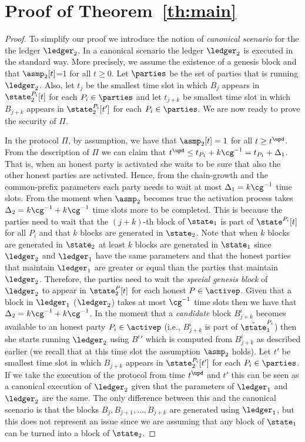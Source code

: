 \section{Proof of Theorem~\ref{th:main}}\label{se:proof}
\begin{proof}
To simplify our proof we introduce the notion of \emph{canonical scenario} for the the ledger $\ledger_2$. In a canonical scenario the ledger
$\ledger_2$ is executed in the standard way. More precisely, 
we assume the existence of a genesis block and that $\asmp_2[t]$=1 for all $t\geq 0$. Let $\parties$ be the set of parties that is running $\ledger_2$. Also, 
let $t_j$ be the smallest time slot in which $B_j$ appears in $\state_2^{P_i}[t]$ for each $P_i\in\parties$ and let $t_{j+k}$ be smallest time slot in which $B_{j+k}$ appears in 
$\state_2^{P_i}[t']$ for each $P_i\in\parties$.
We are now ready to prove the security of $\Pi$.

In the protocol $\Pi$, by assumption, we have that $\asmp_2[t]=1$ for all $t\geq t^\upd$. From the description of $\Pi$ we can claim that $t^\upd \leq t_{P_1}+k\cg^{-1}=t_{P_1}+\Delta_1$.
That is, when an honest party is activated she waits to be sure that also the other honest parties are activated. Hence, from the chain-growth and the common-prefix parameters
each party needs to wait at most $\Delta_1=k\cg^{-1}$ time slots.
From the moment when $\asmp_2$ becomes true the activation process takes $\Delta_2=k \cg^{-1} + k \cg^{-1}$  time slots more to be completed.
This is because the parties need to wait that the $(j+k)$-th block of $\state_1$ is part of $\state^{P_i}[t]$  for all $P_i$ and that $k$ blocks are generated in $\state_2$. Note that when $k$ blocks are generated in $\state_2$ at least 
$k$ blocks are generated in $\state_1$ since $\ledger_2$ and $\ledger_1$ have the same parameters and that the honest parties that maintain $\ledger_1$ are greater or equal than the parties that maintain $\ledger_2$. Therefore, the parties need to wait the \emph{special genesis block} of $\ledger_2$ to appear 
in $\state_2^P[t]$ for each honest $P\in\activep$. Given that a block in $\ledger_1$ ($\ledger_2$) takes at most $\cg^{-1}$ time slots then we have that $\Delta_2=k \cg^{-1} + k \cg^{-1}$.
In the moment that a \emph{candidate} block $B^i_{j+k}$ becomes available to an honest party $P_i\in\activep$ (i.e., $B^i_{j+k}$ is part of $\check \state_1^{P_i}$) then she starts running $\ledger_2$
using ${B^i}'$ which is computed from $B^i_{j+k}$ as described earlier (we recall that at this time slot the assumption $\asmp_2$ holds).
Let $t'$ be  smallest time slot in which $B_{j+k}$ appears in $\state_2^{P_i}[t']$ for each $P_i\in\parties$.
If we take the execution of the protocol from time $t^\upd$ and $t'$ this can be seen as a canonical execution of $\ledger_2$ given
that the parameters of $\ledger_1$ and $\ledger_2$ are the same. The only difference between this and the canonical scenario is
that the blocks $B_{j}, B_{j+1},\dots, B_{j+k}$ are generated using $\ledger_1$, but this does not represent an issue since we are assuming that
any block of $\state_1$ can be turned into a block of $\state_2$. \end{proof}
